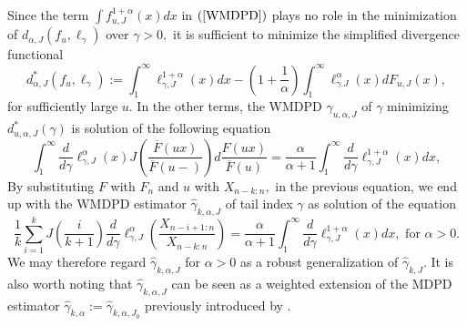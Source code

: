 \documentclass[12pt,reqno,openbib,runningheads,a4paper,portrait]{amsart}%
\begin{document}
Since the term $\int f_{u,J}^{1+\alpha}\left(  x\right)  dx$ in $\left(
\ref{WMDPD}\right)  $ plays no role in the minimization of $d_{\alpha
,J}\left(  f_{u},\ell_{\gamma}\right)  $ over $\gamma>0,$ it is sufficient to
minimize the simplified divergence functional
\begin{equation}
d_{\alpha,J}^{\ast}\left(  f_{u},\ell_{\gamma}\right)  :=\int_{1}^{\infty}%
\ell_{\gamma,J}^{1+\alpha}\left(  x\right)  dx-\left(  1+\dfrac{1}{\alpha
}\right)  \int_{1}^{\infty}\ell_{\gamma.J}^{\alpha}\left(  x\right)
dF_{u,J}\left(  x\right)  , \label{deltau}%
\end{equation}
for sufficiently large $u.$ In the other terms, the WMDPD $\gamma_{u,\alpha
,J}$ of $\gamma$ minimizing $d_{u,\alpha,J}^{\ast}\left(  \gamma\right)  $ is
solution of the following equation%
\[
\int_{1}^{\infty}\dfrac{d}{d\gamma}\ell_{\gamma,J}^{\alpha}\left(  x\right)
J\left(  \dfrac{\overline{F}\left(  ux\right)  }{\overline{F}\left(
u-\right)  }\right)  d\dfrac{F\left(  ux\right)  }{\overline{F}\left(
u\right)  }=\dfrac{\alpha}{\alpha+1}\int_{1}^{\infty}\dfrac{d}{d\gamma}%
\ell_{\gamma,J}^{1+\alpha}\left(  x\right)  dx,
\]
By substituting $F$ with $F_{n}$ and $u$ with $X_{n-k:n},$ in the previous
equation, we end up with the WMDPD estimator $\widehat{\gamma}_{k,\alpha,J}$
of tail index $\gamma$ as solution of the equation
\begin{equation}
\dfrac{1}{k}%
{\displaystyle\sum\limits_{i=1}^{k}}
J\left(  \dfrac{i}{k+1}\right)  \dfrac{d}{d\gamma}\ell_{\gamma,J}^{\alpha
}\left(  \dfrac{X_{n-i+1:n}}{X_{n-k:n}}\right)  =\dfrac{\alpha}{\alpha+1}%
\int_{1}^{\infty}\dfrac{d}{d\gamma}\ell_{\gamma,J}^{1+\alpha}\left(  x\right)
dx,\text{ for }\alpha>0. \label{L}%
\end{equation}
We may therefore regard $\widehat{\gamma}_{k,\alpha,J}$ for $\alpha>0$ as a
robust generalization of $\widehat{\gamma}_{k,J}.$ It is also worth noting
that $\widehat{\gamma}_{k,\alpha,J}$ can be seen as a weighted extension of
the MDPD estimator $\widehat{\gamma}_{k,\alpha}:=\widehat{\gamma}%
_{k,\alpha,J_{0}}$ previously introduced by \cite{DGG13}. \smallskip
\end{document}
